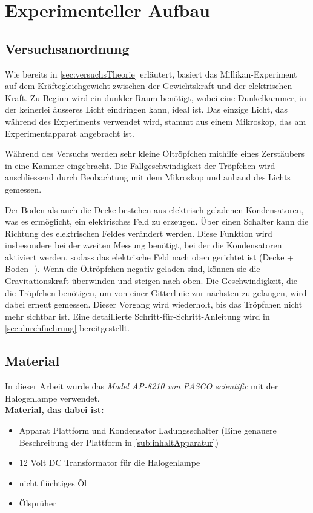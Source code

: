 \chapter{Experimenteller Aufbau}\label{cha:experimentAufbau}
\section{Versuchsanordnung}\label{sec:versuchsanordnung}

Wie bereits in \autoref{sec:versuchsTheorie} erläutert, basiert das Millikan-Experiment auf dem Kräftegleichgewicht zwischen der Gewichtskraft und der elektrischen Kraft. Zu Beginn wird ein dunkler Raum benötigt, wobei eine Dunkelkammer, in der keinerlei äusseres Licht eindringen kann, ideal ist. Das einzige Licht, das während des Experiments verwendet wird, stammt aus einem Mikroskop, das am Experimentapparat angebracht ist.

Während des Versuchs werden sehr kleine Öltröpfchen mithilfe eines Zerstäubers in eine Kammer eingebracht. Die Fallgeschwindigkeit der Tröpfchen wird anschliessend durch Beobachtung mit dem Mikroskop und anhand des Lichts gemessen.

Der Boden als auch die Decke bestehen aus elektrisch geladenen Kondensatoren, was es ermöglicht, ein elektrisches Feld zu erzeugen. Über einen Schalter kann die Richtung des elektrischen Feldes verändert werden. Diese Funktion wird insbesondere bei der zweiten Messung benötigt, bei der die Kondensatoren aktiviert werden, sodass das elektrische Feld nach oben gerichtet ist (Decke + Boden -). Wenn die Öltröpfchen negativ geladen sind, können sie die Gravitationskraft überwinden und steigen nach oben. Die Geschwindigkeit, die die Tröpfchen benötigen, um von einer Gitterlinie zur nächsten zu gelangen, wird dabei erneut gemessen. Dieser Vorgang wird wiederholt, bis das Tröpfchen nicht mehr sichtbar ist. Eine detaillierte Schritt-für-Schritt-Anleitung wird in \autoref{sec:durchfuehrung} bereitgestellt.

\section{Material}\label{sec:material}

In dieser Arbeit wurde das \textit{Model AP-8210 von PASCO scientific} mit der Halogenlampe verwendet. \\

\noindent \textbf{Material, das dabei ist:}

\begin{itemize}
	\item Apparat Plattform und Kondensator Ladungsschalter (Eine genauere Beschreibung der Plattform in \autoref{sub:inhaltApparatur})
	\item 12 Volt DC Transformator für die Halogenlampe
	\item nicht flüchtiges Öl
	\item Ölsprüher 
\end{itemize}

